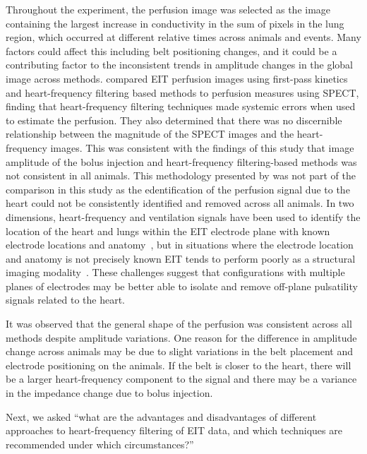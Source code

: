 Throughout the experiment, 
the perfusion image was selected as the image containing 
the largest increase in conductivity in the sum of pixels 
in the lung region, which occurred 
at different relative times across animals and events. Many factors could affect this
including belt positioning changes, and it could be a contributing factor 
to the inconsistent trends in amplitude changes in the global image across methods.
compared EIT perfusion images using first-pass kinetics and 
heart-frequency filtering based methods to perfusion measures using SPECT,
finding that heart-frequency filtering
techniques made systemic errors when used to estimate the perfusion. They also 
determined that there was no discernible relationship between the magnitude of the
SPECT images and the heart-frequency images.
This was consistent with the findings of this study that image amplitude of the bolus injection and 
heart-frequency filtering-based methods was not consistent in all animals.
This methodology presented by 
was not part of the comparison in this study as the edentification of the 
perfusion signal due to the heart could not be consistently
identified and removed across all animals.
In two dimensions, heart-frequency and ventilation signals 
have been used to identify the location 
of the heart and lungs within the EIT electrode plane with known electrode 
locations and anatomy~\parencite{Ferrario2012}, but in situations where the electrode 
location and anatomy is not precisely known EIT tends to perform poorly as a structural 
imaging modality~\parencite{Adler2017a}.
These challenges suggest that configurations with multiple planes of electrodes 
may be better able to isolate and remove off-plane 
pulsatility signals related to the heart.

It was observed that the general shape of 
the perfusion was consistent across all methods despite amplitude variations. 
One reason for the difference in amplitude change across animals may be due 
to slight variations in the belt placement and electrode positioning on the animals.
If the belt is closer to the heart, there will be a larger heart-frequency component 
to the signal and there may be a variance in the impedance change due to bolus injection.

Next, we asked ``what are the advantages and disadvantages of different approaches
to heart-frequency filtering of EIT data, and which techniques are recommended
under which circumstances?''

